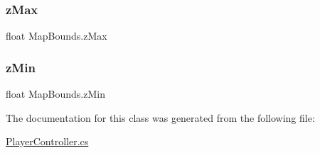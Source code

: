 \mbox{\label{class_map_bounds_ade583e88139ad09d8f232052c5ee2fd0}} 
\subsubsection{\texorpdfstring{z\+Max}{zMax}}
{\footnotesize\ttfamily float Map\+Bounds.\+z\+Max\hspace{0.3cm}{\ttfamily [private]}}

\mbox{\label{class_map_bounds_a10c2fbda66927f1d51dab5ac2f396b0f}} 
\subsubsection{\texorpdfstring{z\+Min}{zMin}}
{\footnotesize\ttfamily float Map\+Bounds.\+z\+Min\hspace{0.3cm}{\ttfamily [private]}}



The documentation for this class was generated from the following file\+:\begin{DoxyCompactItemize}
\item 
\mbox{\hyperlink{_player_controller_8cs}{Player\+Controller.\+cs}}\end{DoxyCompactItemize}
